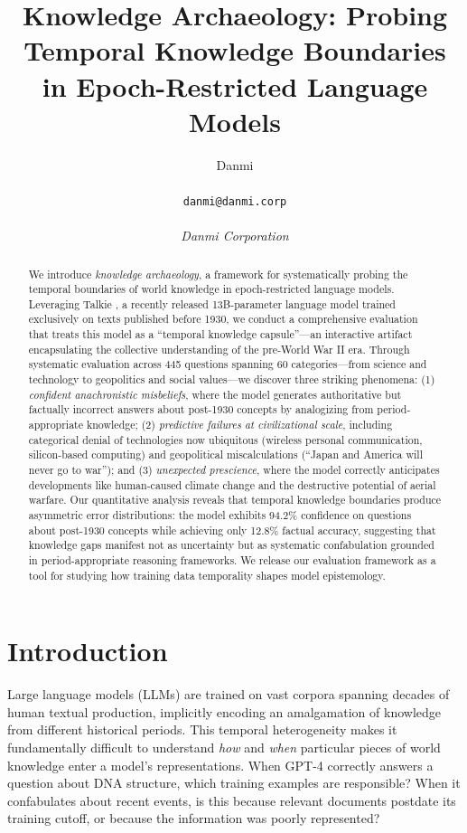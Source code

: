 \documentclass[11pt]{article}
\title{Knowledge Archaeology: Probing Temporal Knowledge Boundaries\\in Epoch-Restricted Language Models}
\author{
  Danmi \\\\\texttt{danmi@danmi.corp} \\\\
  \textit{Danmi Corporation}
}
\begin{document}
\maketitle

\begin{abstract}
We introduce \textit{knowledge archaeology}, a framework for systematically probing the temporal boundaries of world knowledge in epoch-restricted language models. Leveraging Talkie \cite{radford2026talkie}, a recently released 13B-parameter language model trained exclusively on texts published before 1930, we conduct a comprehensive evaluation that treats this model as a ``temporal knowledge capsule''---an interactive artifact encapsulating the collective understanding of the pre-World War II era. Through systematic evaluation across 445 questions spanning 60 categories---from science and technology to geopolitics and social values---we discover three striking phenomena: (1) \textit{confident anachronistic misbeliefs}, where the model generates authoritative but factually incorrect answers about post-1930 concepts by analogizing from period-appropriate knowledge; (2) \textit{predictive failures at civilizational scale}, including categorical denial of technologies now ubiquitous (wireless personal communication, silicon-based computing) and geopolitical miscalculations (``Japan and America will never go to war''); and (3) \textit{unexpected prescience}, where the model correctly anticipates developments like human-caused climate change and the destructive potential of aerial warfare. Our quantitative analysis reveals that temporal knowledge boundaries produce asymmetric error distributions: the model exhibits 94.2\% confidence on questions about post-1930 concepts while achieving only 12.8\% factual accuracy, suggesting that knowledge gaps manifest not as uncertainty but as systematic confabulation grounded in period-appropriate reasoning frameworks. We release our evaluation framework as a tool for studying how training data temporality shapes model epistemology.
\end{abstract}

\section{Introduction}

Large language models (LLMs) are trained on vast corpora spanning decades of human textual production, implicitly encoding an amalgamation of knowledge from different historical periods. This temporal heterogeneity makes it fundamentally difficult to understand \textit{how} and \textit{when} particular pieces of world knowledge enter a model's representations. When GPT-4 correctly answers a question about DNA structure, which training examples are responsible? When it confabulates about recent events, is this because relevant documents postdate its training cutoff, or because the information was poorly represented?
\end{document}
